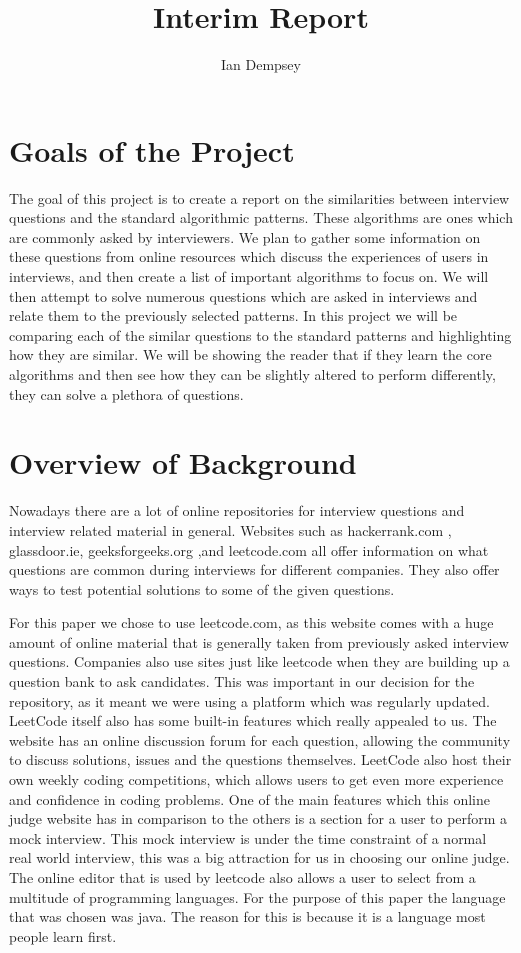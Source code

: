 \documentclass{article}
\title{Interim Report}
\author{Ian Dempsey}
\begin{document}
\maketitle
{}
\section{Goals of the Project}
The goal of this project is to create a report on the similarities between interview questions and the standard algorithmic patterns. These algorithms are ones which are commonly asked by interviewers. We plan to gather some information on these questions from online resources which discuss the experiences of users in interviews, and then create a list of important algorithms to focus on. We will then attempt to solve numerous questions which are asked in interviews and relate them to the previously selected patterns. In this project we will be comparing each of the similar questions to the standard patterns and highlighting how they are similar. We will be showing the reader that if they learn the core algorithms and then see how they can be slightly altered to perform differently, they can solve a plethora of questions.

\section{Overview of Background}
\par Nowadays there are a lot of online repositories for interview questions and interview related material in general. Websites such as hackerrank.com , glassdoor.ie, geeksforgeeks.org ,and leetcode.com all offer information on what questions are common during interviews for different companies. They also offer ways to test potential solutions to some of the given questions. 
\par For this paper we chose to use leetcode.com, as this website comes with a huge amount of online material that is generally taken from previously asked interview questions. Companies also use sites just like leetcode when they are building up a question bank to ask candidates. This was important in our decision for the repository, as it meant we were using a platform which was regularly updated. LeetCode itself also has some built-in features which really appealed to us. The website has an online discussion forum for each question, allowing the community to discuss solutions, issues and the questions themselves. LeetCode also host their own weekly coding competitions, which allows users to get even more experience and confidence in coding problems. One of the main features which this online judge website has in comparison to the others is a section for a user to perform a mock interview. This mock interview is under the time constraint of a normal real world interview, this was a big attraction for us in choosing our online judge. The online editor that is used by leetcode also allows a user to select from a multitude of programming languages. For the purpose of this paper the language that was chosen was java. The reason for this is because it is a language most people learn first.
\end{document}
